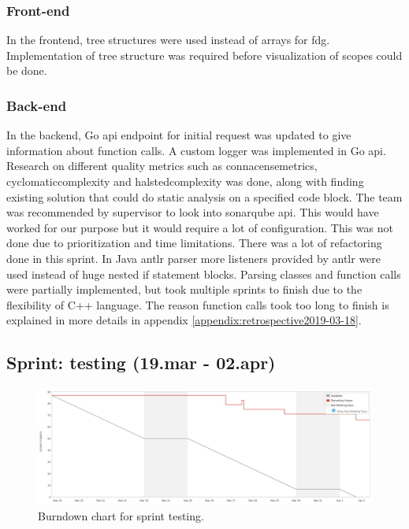 \subsubsection{Front-end}
In the \gls{frontend}, tree structures were used instead of arrays for \gls{fdg}. Implementation of tree structure was required before visualization of scopes could be done.
\subsubsection{Back-end}
In the \gls{backend}, Go \gls{api} endpoint for initial request was updated to give information about function calls. A custom logger was implemented in Go \gls{api}. Research on different quality metrics such as \Gls{connacensemetrics}, \Gls{cyclomaticcomplexity} and \Gls{halstedcomplexity} was done, along with finding existing solution that could do static analysis on a specified code block. The team was recommended by supervisor to look into \gls{sonarqube} \gls{api}. This would have worked for our purpose but it would require a lot of configuration. This was not done due to prioritization and time limitations. 
There was a lot of refactoring done in this \gls{sprint}. In Java \gls{antlr} parser more listeners provided by \gls{antlr} were used instead of huge nested if statement blocks.  Parsing classes and function calls were partially implemented, but took multiple \glspl{sprint} to finish due to the flexibility of C++ language. The reason function calls took too long to finish is explained in more details in appendix \ref{appendix:retrospective2019-03-18}.

\subsection{Sprint: testing (19.mar - 02.apr)}
\begin{figure}[H] 
    \includegraphics[width=\textwidth]{inc/images/sprints/sprintTest190319-020419.png}
    \caption{Burndown chart for sprint testing.}
    \label{fig:sprintTesting}
\end{figure}

